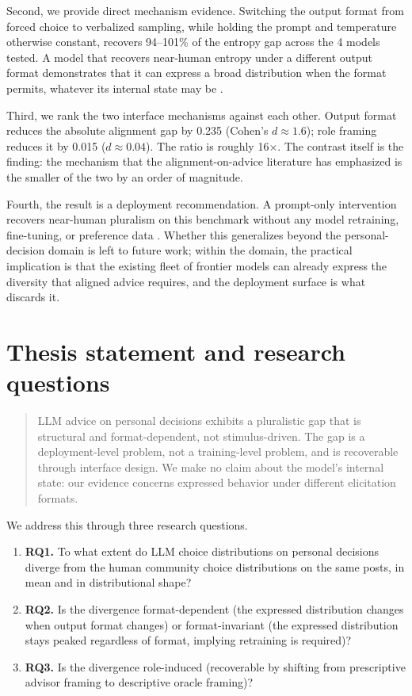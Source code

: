 Second, we provide direct mechanism evidence. Switching the output
format from forced choice to verbalized sampling, while holding the
prompt and temperature otherwise constant, recovers 94--101\% of the
entropy gap across the 4 models tested. A model that recovers
near-human entropy under a different output format demonstrates that it
can express a broad distribution when the format permits, whatever its
internal state may be \citep{zhang-2025-verbalized-sampling}.

Third, we rank the two interface mechanisms against each other.
Output format reduces the absolute alignment gap by 0.235 (Cohen's $d
\approx 1.6$); role framing reduces it by 0.015 ($d \approx 0.04$).
The ratio is roughly 16$\times$. The contrast itself is the finding:
the mechanism that the alignment-on-advice literature has emphasized
is the smaller of the two by an order of magnitude.

Fourth, the result is a deployment recommendation. A prompt-only
intervention recovers near-human pluralism on this benchmark without
any model retraining, fine-tuning, or preference data
\citep{russo-2026-pluralistic}. Whether this generalizes beyond the
personal-decision domain is left to future work; within the domain,
the practical implication is that the existing fleet of frontier
models can already express the diversity that aligned advice requires,
and the deployment surface is what discards it.

\section{Thesis statement and research questions}
\label{sec:rqs}

\begin{quote}
LLM advice on personal decisions exhibits a pluralistic gap that is
structural and format-dependent, not stimulus-driven. The gap is a
deployment-level problem, not a training-level problem, and is
recoverable through interface design. We make no claim about the
model's internal state: our evidence concerns expressed behavior under
different elicitation formats.
\end{quote}

\noindent We address this through three research questions.

\begin{enumerate}
  \item \textbf{RQ1.} To what extent do LLM choice distributions on
        personal decisions diverge from the human community choice
        distributions on the same posts, in mean and in distributional
        shape?
  \item \textbf{RQ2.} Is the divergence format-dependent (the expressed
        distribution changes when output format changes) or
        format-invariant (the expressed distribution stays peaked
        regardless of format, implying retraining is required)?
  \item \textbf{RQ3.} Is the divergence role-induced (recoverable by
        shifting from prescriptive advisor framing to descriptive
        oracle framing)?
\end{enumerate}

